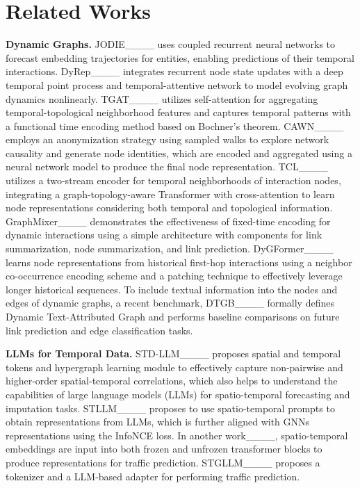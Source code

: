 \section{Related Works}
\textbf{Dynamic Graphs.} JODIE____ uses coupled recurrent neural networks to forecast embedding trajectories for entities, enabling predictions of their temporal interactions. DyRep____ integrates recurrent node state updates with a deep temporal point process and temporal-attentive network to model evolving graph dynamics nonlinearly. TGAT____ utilizes self-attention for aggregating temporal-topological neighborhood features and captures temporal patterns with a functional time encoding method based on Bochner's theorem. CAWN____ employs an anonymization strategy using sampled walks to explore network causality and generate node identities, which are encoded and aggregated using a neural network model to produce the final node representation. TCL____ utilizes a two-stream encoder for temporal neighborhoods of interaction nodes, integrating a graph-topology-aware Transformer with cross-attention to learn node representations considering both temporal and topological information. GraphMixer____ demonstrates the effectiveness of fixed-time encoding for dynamic interactions using a simple architecture with components for link summarization, node summarization, and link prediction. DyGFormer____ learns node representations from historical first-hop interactions using a neighbor co-occurrence encoding scheme and a patching technique to effectively leverage longer historical sequences. To include textual information into the nodes and edges of dynamic graphs, a recent benchmark, DTGB____ formally defines Dynamic Text-Attributed Graph and performs baseline comparisons on future link prediction and edge classification tasks.

\textbf{LLMs for Temporal Data.} STD-LLM____ proposes spatial and temporal tokens and hypergraph learning module to effectively capture non-pairwise and higher-order spatial-temporal correlations, which also helps to understand the capabilities of large language models (LLMs) for spatio-temporal forecasting and imputation tasks.  STLLM____ proposes to use spatio-temporal prompts to obtain representations from LLMs, which is further aligned with GNNs representations using the InfoNCE loss. In another work____, spatio-temporal embeddings are input into both frozen and unfrozen transformer blocks to produce representations for traffic prediction. STGLLM____ proposes a tokenizer and a LLM-based adapter for performing traffic prediction.


